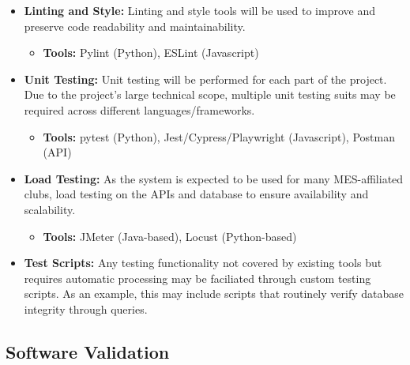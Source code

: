\documentclass[12pt, titlepage]{article}
\begin{document}
\begin{itemize}
  \item \textbf{Linting and Style:} Linting and style tools will be used to improve and preserve
  code readability and maintainability.
  \begin{itemize}
    \item \textbf{Tools:} Pylint (Python), ESLint (Javascript)
  \end{itemize}
  \item \textbf{Unit Testing:} Unit testing will be performed for each part of the project. Due 
  to the project's large technical scope, multiple unit testing suits may be required across 
  different languages/frameworks.
  \begin{itemize}
    \item \textbf{Tools:} pytest (Python), Jest/Cypress/Playwright (Javascript), Postman (API)
  \end{itemize}
  \item \textbf{Load Testing:} As the system is expected to be used for many MES-affiliated clubs, 
  load testing on the APIs and database to ensure availability and scalability.
  \begin{itemize}
    \item \textbf{Tools:} JMeter (Java-based), Locust (Python-based)
  \end{itemize} 
  \item \textbf{Test Scripts:} Any testing functionality not covered by existing tools but requires
  automatic processing may be faciliated through custom testing scripts. As an example, this may 
  include scripts that routinely verify database integrity through queries.
\end{itemize}

\subsection{Software Validation}



\end{document}
